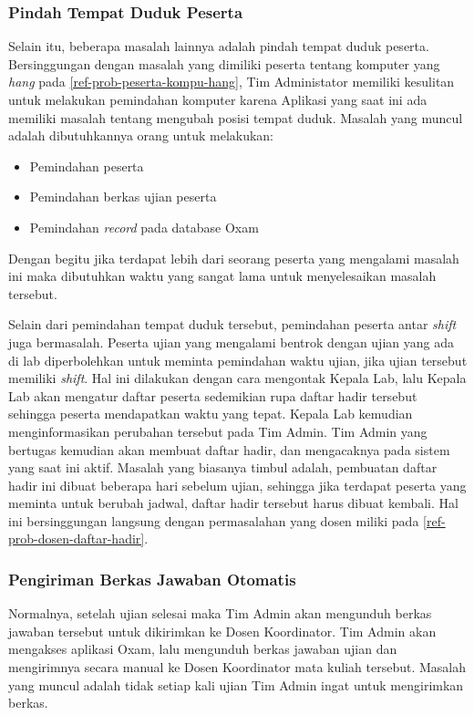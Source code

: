     \subsubsection{Pindah Tempat Duduk Peserta}\label{ref-prob-admin-pindah}
    Selain itu, beberapa masalah lainnya adalah pindah tempat duduk peserta.
    Bersinggungan dengan masalah yang dimiliki peserta tentang komputer yang
    \textit{hang} pada \ref{ref-prob-peserta-kompu-hang}, Tim Administator
    memiliki kesulitan untuk melakukan pemindahan komputer karena Aplikasi yang
    saat ini ada memiliki masalah tentang mengubah posisi tempat duduk. Masalah
    yang muncul adalah dibutuhkannya orang untuk melakukan:
    \begin{itemize}
        \item Pemindahan peserta
        \item Pemindahan berkas ujian peserta
        \item Pemindahan \textit{record} pada database Oxam
    \end{itemize}

    Dengan begitu jika terdapat lebih dari seorang peserta yang mengalami
    masalah ini maka dibutuhkan waktu yang sangat lama untuk menyelesaikan
    masalah tersebut.
    
    Selain dari pemindahan tempat duduk tersebut, pemindahan peserta antar
    \textit{shift} juga bermasalah. Peserta ujian yang mengalami bentrok dengan
    ujian yang ada di lab diperbolehkan untuk meminta pemindahan waktu ujian,
    jika ujian tersebut memiliki \textit{shift}. Hal ini dilakukan dengan cara
    mengontak Kepala Lab, lalu Kepala Lab akan mengatur daftar peserta
    sedemikian rupa daftar hadir tersebut sehingga peserta mendapatkan waktu
    yang tepat. Kepala Lab kemudian menginformasikan perubahan tersebut pada Tim
    Admin. Tim Admin yang bertugas kemudian akan membuat daftar hadir, dan
    mengacaknya pada sistem yang saat ini aktif. Masalah yang biasanya timbul
    adalah, pembuatan daftar hadir ini dibuat beberapa hari sebelum ujian,
    sehingga jika terdapat peserta yang meminta untuk berubah jadwal, daftar
    hadir tersebut harus dibuat kembali. Hal ini bersinggungan langsung dengan
    permasalahan yang dosen miliki pada \ref{ref-prob-dosen-daftar-hadir}.

    \subsubsection{Pengiriman Berkas Jawaban
    Otomatis}\label{ref-prob-admin-pengiriman-berkas} Normalnya, setelah ujian
    selesai maka Tim Admin akan mengunduh berkas jawaban tersebut untuk
    dikirimkan ke Dosen Koordinator. Tim Admin akan mengakses aplikasi Oxam,
    lalu mengunduh berkas jawaban ujian dan mengirimnya secara manual ke Dosen
    Koordinator mata kuliah tersebut. Masalah yang muncul adalah tidak setiap
    kali ujian Tim Admin ingat untuk mengirimkan berkas.
    
